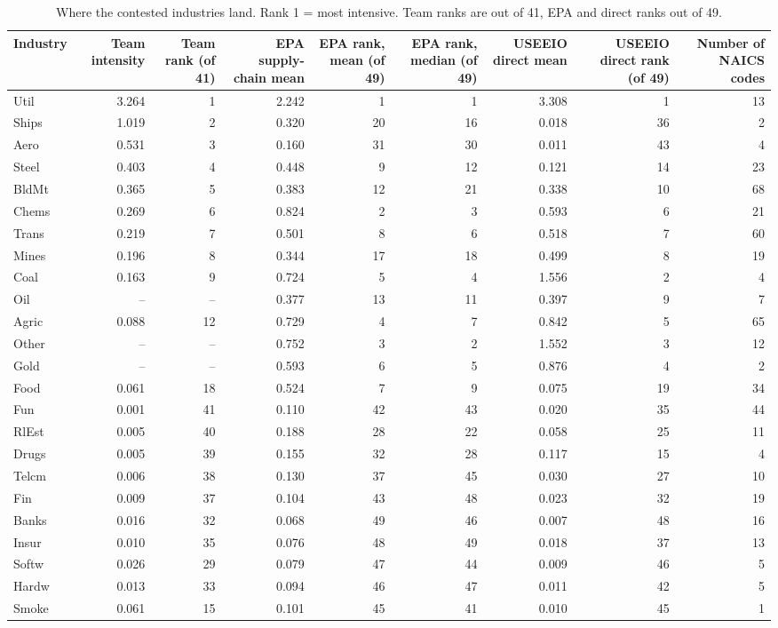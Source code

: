 \begin{table}[H]
\centering\small
\caption{Where the contested industries land. Rank 1 = most intensive. Team ranks are out of 41, EPA and direct ranks out of 49.}
\label{tab:m4_key_industries}
\begin{adjustbox}{max width=\linewidth}
\begin{tabular}{lrrrrrrrr}
\toprule
Industry & Team intensity & Team rank (of 41) & EPA supply-chain mean & EPA rank, mean (of 49) & EPA rank, median (of 49) & USEEIO direct mean & USEEIO direct rank (of 49) & Number of NAICS codes \\
\midrule
Util & 3.264 & 1 & 2.242 & 1 & 1 & 3.308 & 1 & 13 \\
Ships & 1.019 & 2 & 0.320 & 20 & 16 & 0.018 & 36 & 2 \\
Aero & 0.531 & 3 & 0.160 & 31 & 30 & 0.011 & 43 & 4 \\
Steel & 0.403 & 4 & 0.448 & 9 & 12 & 0.121 & 14 & 23 \\
BldMt & 0.365 & 5 & 0.383 & 12 & 21 & 0.338 & 10 & 68 \\
Chems & 0.269 & 6 & 0.824 & 2 & 3 & 0.593 & 6 & 21 \\
Trans & 0.219 & 7 & 0.501 & 8 & 6 & 0.518 & 7 & 60 \\
Mines & 0.196 & 8 & 0.344 & 17 & 18 & 0.499 & 8 & 19 \\
Coal & 0.163 & 9 & 0.724 & 5 & 4 & 1.556 & 2 & 4 \\
Oil & -- & -- & 0.377 & 13 & 11 & 0.397 & 9 & 7 \\
Agric & 0.088 & 12 & 0.729 & 4 & 7 & 0.842 & 5 & 65 \\
Other & -- & -- & 0.752 & 3 & 2 & 1.552 & 3 & 12 \\
Gold & -- & -- & 0.593 & 6 & 5 & 0.876 & 4 & 2 \\
Food & 0.061 & 18 & 0.524 & 7 & 9 & 0.075 & 19 & 34 \\
Fun & 0.001 & 41 & 0.110 & 42 & 43 & 0.020 & 35 & 44 \\
RlEst & 0.005 & 40 & 0.188 & 28 & 22 & 0.058 & 25 & 11 \\
Drugs & 0.005 & 39 & 0.155 & 32 & 28 & 0.117 & 15 & 4 \\
Telcm & 0.006 & 38 & 0.130 & 37 & 45 & 0.030 & 27 & 10 \\
Fin & 0.009 & 37 & 0.104 & 43 & 48 & 0.023 & 32 & 19 \\
Banks & 0.016 & 32 & 0.068 & 49 & 46 & 0.007 & 48 & 16 \\
Insur & 0.010 & 35 & 0.076 & 48 & 49 & 0.018 & 37 & 13 \\
Softw & 0.026 & 29 & 0.079 & 47 & 44 & 0.009 & 46 & 5 \\
Hardw & 0.013 & 33 & 0.094 & 46 & 47 & 0.011 & 42 & 5 \\
Smoke & 0.061 & 15 & 0.101 & 45 & 41 & 0.010 & 45 & 1 \\
\bottomrule
\end{tabular}
\end{adjustbox}
\end{table}
